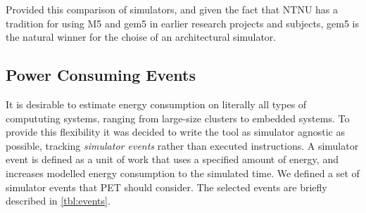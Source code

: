 Provided this comparison of simulators, and given the fact that NTNU has a tradition
for using M5 and gem5 in earlier research projects and subjects, gem5 is the natural
winner for the choise of an architectural simulator.


\subsection{Power Consuming Events}
\label{subsec:powerevents}
It is desirable to estimate energy consumption on literally all types of
compututing systems, ranging from large-size clusters to embedded systems. To
provide this flexibility it was decided to write the tool as simulator agnostic
as possible, tracking \emph{simulator events} rather than executed instructions.
A simulator event is defined as a unit of work that uses a specified amount of
energy, and increases modelled energy consumption to the simulated time. We
defined a set of simulator events that PET should consider. The selected events
are briefly described in \autoref{tbl:events}.

